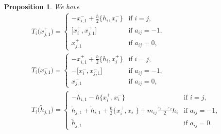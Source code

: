 \documentclass[11pt]{article}
\newtheorem{prop}[thm]{Proposition}
\theoremstyle{definition}
\numberwithin{equation}{section}
\newcommand{\ve}{\varepsilon}
\begin{document}
\begin{prop}\label{prop:formula2}We have
\begin{gather*}
T_i\big(x_{j,1}^+\big) = \begin{cases}
-x_{i,1}^- + \tfrac{\hbar}{2}\big\{ h_i, x_i^- \big\} & \text{if $i=j$},\\
\big[x_i^+,x_{j,1}^+\big] & \text{if $a_{ij}=-1$},\\
x_{j,1}^+ & \text{if $a_{ij}=0$},
\end{cases} \\
T_i\big(x_{j,1}^-\big) = \begin{cases}
-x_{i,1}^+ + \tfrac{\hbar}{2}\big\{ h_i, x_i^+ \big\} & \text{if $i=j$},\\
-\big[x_{i}^-,x_{j,1}^-\big] & \text{if $a_{ij}=-1$},\\
x_{j,1}^- & \text{if $a_{ij}=0$},
\end{cases}
\\
T_i\big(\tilde{h}_{j,1}\big) = \begin{cases}
-\tilde{h}_{i,1} - \hbar \big\{ x_i^+,x_i^- \big\} & \text{if $i=j$},\\
\tilde{h}_{j,1} + \tilde{h}_{i,1} + \tfrac{\hbar}{2} \big\{ x_i^+,x_i^- \big\} + m_{ij}\tfrac{\ve_1 - \ve_2}{2} h_i & \text{if $a_{ij}=-1$},\\
\tilde{h}_{j,1} & \text{if $a_{ij}=0$}.
\end{cases}
\end{gather*}
\end{prop}
\end{document}
